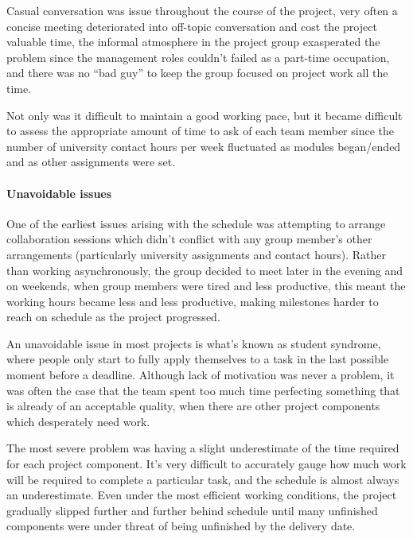 Casual conversation was issue throughout the course of the project, very often a concise meeting deteriorated into off-topic conversation and cost the project valuable time, the informal atmosphere in the project group exasperated the problem since the management roles couldn't failed as a part-time occupation, and there was no ``bad guy'' to keep the group focused on project work all the time.

Not only was it difficult to maintain a good working pace, but it became difficult to assess the appropriate amount of time to ask of each team member since the number of university contact hours per week fluctuated as modules began/ended and as other assignments were set.

\paragraph{Unavoidable issues}
One of the earliest issues arising with the schedule was attempting to arrange collaboration sessions which didn't conflict with any group member's other arrangements (particularly university assignments and contact hours). Rather than working asynchronously, the group decided to meet later in the evening and on weekends, when group members were tired and less productive, this meant the working hours became less and less productive, making milestones harder to reach on schedule as the project progressed.

An unavoidable issue in most projects is what's known as student syndrome, where people only start to fully apply themselves to a task in the last possible moment before a deadline.
Although lack of motivation was never a problem, it was often the case that the team spent too much time perfecting something that is already of an acceptable quality, when there are other project components which desperately need work.

The most severe problem was having a slight underestimate of the time required for each project component. It's very difficult to accurately gauge how much work will be required to complete a particular task, and the schedule is almost always an underestimate. Even under the most efficient working conditions, the project gradually slipped further and further behind schedule until many unfinished components were under threat of being unfinished by the delivery date.

